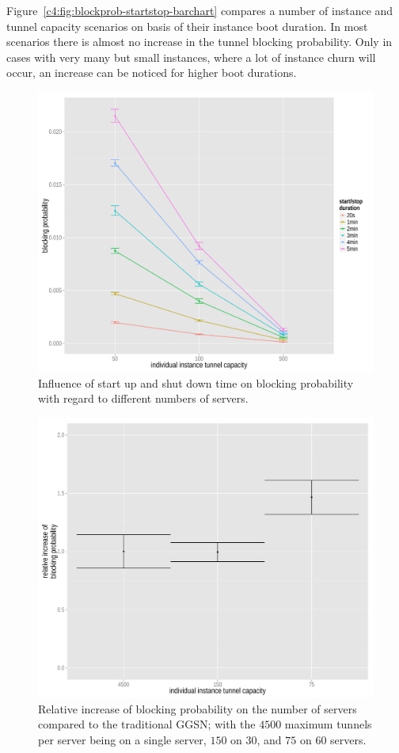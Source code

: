 Figure~\ref{c4:fig:blockprob-startstop-barchart} compares a number of instance and tunnel capacity scenarios on basis of their instance boot duration. In most scenarios there is almost no increase in the tunnel blocking probability. Only in cases with very many but small instances, where a lot of instance churn will occur, an increase can be noticed for higher boot durations.

\begin{figure}[htb]
  \centering
  \includegraphics[width=1.0\textwidth]{images/compare-maxinstances-block.pdf}
  \caption{Influence of start up and shut down time on blocking probability with regard to different numbers of servers.}
\label{c4:fig:compare_maxinstances_block}
\end{figure}

\begin{figure}[htb]
  \centering
  \includegraphics[width=1.0\textwidth]{images/blocking-comparison.pdf}
  \caption{Relative increase of blocking probability on the number of servers compared to the traditional \gls{GGSN}; with the $4500$ maximum tunnels per server being on a single server, $150$ on $30$, and $75$ on $60$ servers.}
\label{c4:fig:blocking-comparison}
\end{figure}

